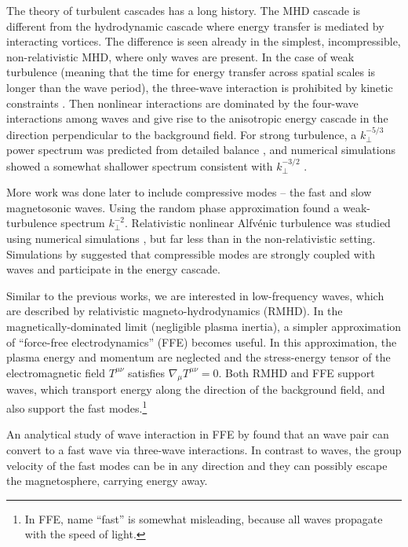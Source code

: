 The theory of turbulent cascades has a long history. The MHD cascade is different from the hydrodynamic cascade where energy transfer is mediated by interacting vortices. The difference is seen already in the simplest, incompressible, non-relativistic MHD, where only \alfven waves are present. In the case of weak turbulence (meaning that the time for energy transfer across spatial scales is longer than the wave period),
the three-wave interaction is prohibited by kinetic constraints \citep{1994ApJ...432..612S}. 
Then nonlinear interactions are dominated by the four-wave interactions among \alfven waves and give rise to the anisotropic energy cascade in the direction perpendicular to the background field. 
For strong turbulence, a $k_\perp^{-5/3}$ power spectrum was predicted from detailed balance \citep{1995ApJ...438..763G}, and numerical simulations showed a somewhat shallower spectrum consistent with $k_\perp^{-3/2}$ \citep{2001ApJ...554.1175M,2008PhRvE..77c6403M,2012PhPl...19e5902M}.

More work was done later to include compressive modes -- the fast and slow magnetosonic waves.
Using the random phase approximation \citet{2001JETP...93.1052K} found a weak-turbulence spectrum $k_{\perp}^{-2}$.
Relativistic nonlinear Alfv\'enic turbulence was studied using numerical simulations \citep{2005ApJ...621..324C,2012ApJ...744...32Z,2016ApJ...817...89Z,2016ApJ...831L..11T,2017MNRAS.472.4542T}, but far less than in the non-relativistic setting. 
Simulations by \citet{2016ApJ...831L..11T,2017MNRAS.472.4542T} suggested that compressible modes are strongly coupled with \alfven waves and participate in the energy cascade.

Similar to the previous works, we are interested in low-frequency waves, which are described by relativistic magneto-hydrodynamics (RMHD). In the magnetically-dominated limit (negligible plasma inertia), a simpler approximation of ``force-free electrodynamics'' (FFE) becomes useful. In this approximation, the plasma energy and momentum are neglected and the stress-energy tensor of the electromagnetic field $T^{\mu\nu}$ satisfies $\nabla_\mu T^{\mu\nu}=0$.
Both RMHD and FFE support \alfven waves, which transport energy along the direction of the background field, and also support the fast modes.\footnote{In FFE, name ``fast'' is somewhat misleading, because all waves propagate with the speed of light.}

An analytical study of wave interaction in FFE by \citet{1998PhRvD..57.3219T} found that an \alfven wave pair can convert to a fast wave via three-wave interactions. 
In contrast to \alfven waves, the group velocity of the fast modes can be in any direction and they can possibly escape the magnetosphere, carrying energy away.

